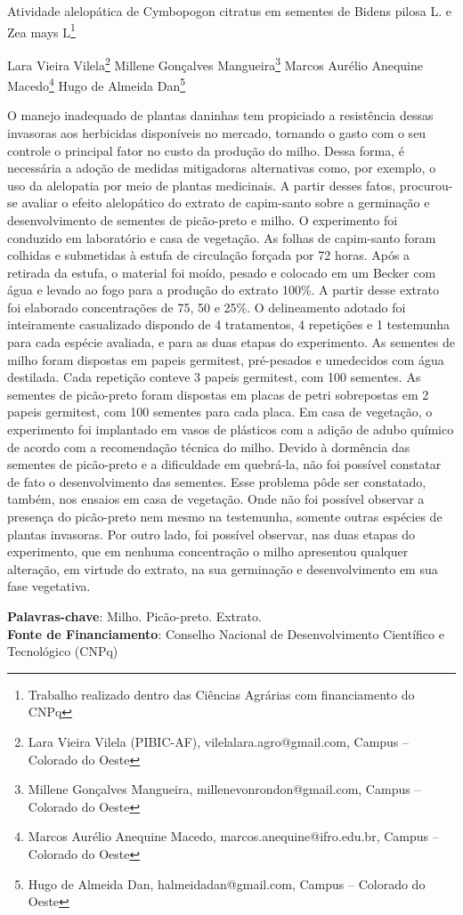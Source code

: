 \documentclass[article,12pt,onesidea,4paper,english,brazil]{abntex2}
\begin{document}
	
	
	\frenchspacing 
	
	\begin{center}
		\LARGE Atividade alelopática de Cymbopogon citratus em sementes de Bidens pilosa L. e Zea mays L\footnote{Trabalho realizado dentro das Ciências Agrárias com financiamento do CNPq}
		
		\normalsize
		Lara Vieira Vilela\footnote{Lara Vieira Vilela (PIBIC-AF), vilelalara.agro@gmail.com, Campus – Colorado do Oeste} 
		Millene Gonçalves Mangueira\footnote{Millene Gonçalves Mangueira, millenevonrondon@gmail.com, Campus – Colorado do Oeste} 
		Marcos Aurélio Anequine Macedo\footnote{Marcos Aurélio Anequine Macedo, marcos.anequine@ifro.edu.br, Campus – Colorado do Oeste} 
		Hugo de Almeida Dan\footnote{Hugo de Almeida Dan, halmeidadan@gmail.com, Campus – Colorado do Oeste} 
	\end{center}
	
	\noindent O manejo inadequado de plantas daninhas tem propiciado a resistência dessas invasoras aos herbicidas disponíveis no mercado, tornando o gasto com o seu controle o principal fator no custo da produção do milho. Dessa forma, é necessária a adoção de medidas mitigadoras alternativas como, por exemplo, o uso da alelopatia por meio de plantas medicinais. A partir desses fatos, procurou-se avaliar o efeito alelopático do extrato de capim-santo sobre a germinação e desenvolvimento de sementes de picão-preto e milho. O experimento foi conduzido em laboratório e casa de vegetação. As folhas de capim-santo foram colhidas e submetidas à estufa de circulação forçada por 72 horas. Após a retirada da estufa, o material foi moído, pesado e colocado em um Becker com água e levado ao fogo para a produção do extrato 100\%. A partir desse extrato foi elaborado concentrações de 75, 50 e 25\%. O delineamento adotado foi inteiramente casualizado dispondo de 4 tratamentos, 4 repetições e 1 testemunha para cada espécie avaliada, e para as duas etapas do experimento. As sementes de milho foram dispostas em papeis germitest, pré-pesados e umedecidos com água destilada. Cada repetição conteve 3 papeis germitest, com 100 sementes. As sementes de picão-preto foram dispostas em placas de petri sobrepostas em 2 papeis germitest, com 100 sementes para cada placa. Em casa de vegetação, o experimento foi implantado em vasos de plásticos com a adição de adubo químico de acordo com a recomendação técnica do milho. Devido à dormência das sementes de picão-preto e a dificuldade em quebrá-la, não foi possível constatar de fato o desenvolvimento das sementes. Esse problema pôde ser constatado, também, nos ensaios em casa de vegetação. Onde não foi possível observar a presença do picão-preto nem mesmo na testemunha, somente outras espécies de plantas invasoras. Por outro lado, foi possível observar, nas duas etapas do experimento, que em nenhuma concentração o milho apresentou qualquer alteração, em virtude do extrato, na sua germinação e desenvolvimento em sua fase vegetativa.
	
	\vspace{\onelineskip}
	
	\noindent
	\textbf{Palavras-chave}: Milho. Picão-preto. Extrato. \\
	\textbf{Fonte de Financiamento}: Conselho Nacional de Desenvolvimento Científico e Tecnológico (CNPq) 
	
\end{document}
